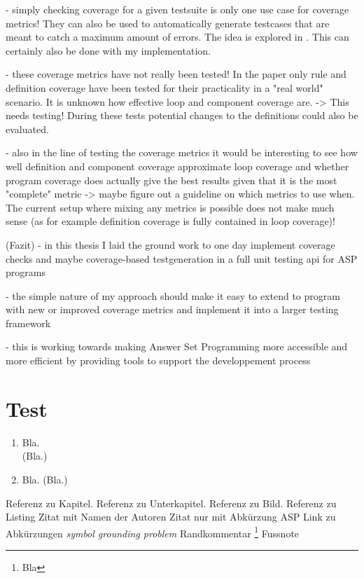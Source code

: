 - simply checking coverage for a given testsuite is only one use case for coverage metrics! They can also be used to automatically generate 
testcases that are meant to catch a maximum amount of errors. The idea is explored in \cite{Jan+11}. This can certainly also be done with 
my implementation.

- these coverage metrics have not really been tested! In the paper \cite{Jan+11} only rule and definition coverage have been tested for 
their practicality in a "real world" scenario. It is unknown how effective loop and component coverage are. -> This needs testing! 
During these tests potential changes to the definitions could also be evaluated.

- also in the line of testing the coverage metrics it would be interesting to see how well definition and component coverage approximate 
loop coverage and whether program coverage does actually give the best results given that it is the most "complete" metric
-> maybe figure out a guideline on which metrics to use when. The current setup where mixing any metrics is possible does not make much 
sense (as for example definition coverage is fully contained in loop coverage)!


(Fazit)
- in this thesis I laid the ground work to one day implement coverage checks and maybe coverage-based testgeneration in a full unit 
testing api for ASP programs

- the simple nature of my approach should make it easy to extend to program with new or improved coverage metrics and implement it 
into a larger testing framework

- this is working towards making Answer Set Programming more accessible and more efficient by providing tools to support the 
developpement process



\chapter{Test}
\label{ch:Test}

\begin{enumerate}
    \item Bla.\\
    (Bla.)
    \item Bla. (Bla.)
\end{enumerate}

 Referenz zu Kapitel.
 Referenz zu Unterkapitel. 
 Referenz zu Bild.
 Referenz zu Listing
\textcite{Jan+10} Zitat mit Namen der Autoren
\cite{Jan+10} Zitat nur mit Abkürzung
\ac{ASP} Link zu Abkürzungen
\emph{symbol grounding problem} 
 Randkommentar
\footnote{Bla} Fussnote

